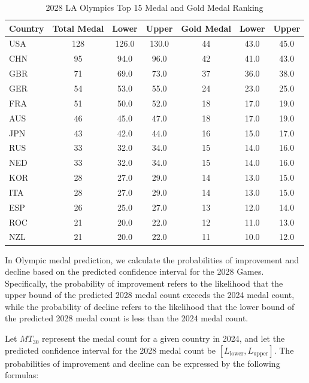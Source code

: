 \documentclass{mcmthesis}
\renewcommand{\arraystretch}{1.2}
\begin{document}
\begin{table}[H]
	\centering
	\caption{2028 LA Olympics Top 15 Medal and Gold Medal Ranking}
	\label{tab:combined_medals}
	\renewcommand{\arraystretch}{1.2}
	\begin{tabularx}{\textwidth}{l|ccc|ccc}
		\toprule
		\rowcolor{red!10}
		\textbf{Country} & \textbf{Total Medal} & \textbf{Lower} & \textbf{Upper} & \textbf{Gold Medal} & \textbf{Lower} & \textbf{Upper} \\
		\midrule
		\rowcolor{gray!10}
		USA & 128 & 126.0 & 130.0 & 44 & 43.0 & 45.0 \\
		CHN & 95 & 94.0 & 96.0 & 42 & 41.0 & 43.0 \\
		\rowcolor{gray!10}
		GBR & 71 & 69.0 & 73.0 & 37 & 36.0 & 38.0 \\
		GER & 54 & 53.0 & 55.0 & 24 & 23.0 & 25.0 \\
		\rowcolor{gray!10}
		FRA & 51 & 50.0 & 52.0 & 18 & 17.0 & 19.0 \\
		AUS & 46 & 45.0 & 47.0 & 18 & 17.0 & 19.0 \\
		\rowcolor{gray!10}
		JPN & 43 & 42.0 & 44.0 & 16 & 15.0 & 17.0 \\
		RUS & 33 & 32.0 & 34.0 & 15 & 14.0 & 16.0 \\
		\rowcolor{gray!10}
		NED & 33 & 32.0 & 34.0 & 15 & 14.0 & 16.0 \\
		KOR & 28 & 27.0 & 29.0 & 14 & 13.0 & 15.0 \\
		\rowcolor{gray!10}
		ITA & 28 & 27.0 & 29.0 & 14 & 13.0 & 15.0 \\
		ESP & 26 & 25.0 & 27.0 & 13 & 12.0 & 14.0 \\
		\rowcolor{gray!10}
		ROC & 21 & 20.0 & 22.0 & 12 & 11.0 & 13.0 \\
		NZL & 21 & 20.0 & 22.0 & 11 & 10.0 & 12.0 \\
		\bottomrule
	\end{tabularx}
	\label{12}
\end{table}

In Olympic medal prediction, we calculate the probabilities of improvement and decline based on the predicted confidence interval for the 2028 Games. Specifically, the probability of improvement refers to the likelihood that the upper bound of the predicted 2028 medal count exceeds the 2024 medal count, while the probability of decline refers to the likelihood that the lower bound of the predicted 2028 medal count is less than the 2024 medal count.

Let \( MT_{30} \) represent the medal count for a given country in 2024, and let the predicted confidence interval for the 2028 medal count be \([L_{\text{lower}}, L_{\text{upper}}]\). The probabilities of improvement and decline can be expressed by the following formulas:
\end{document}
